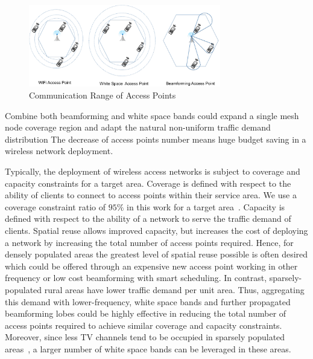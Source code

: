 \begin{figure}
\centering
\includegraphics[width=84mm]{figures/com_range}
\vspace{-0.1in}
\caption{Communication Range of Access Points}                                                                 
\label{fig:aprange}
\vspace{-0.1in}
\end{figure}

Combine both beamforming and white space bands could expand a 
single mesh node coverage region 
and adapt the natural non-uniform 
traffic demand distribution 
The decrease of access points number means huge budget saving
in a wireless network deployment.

Typically, the deployment of wireless access networks is subject to coverage and capacity
constraints for a target area. Coverage is defined with respect to the ability of
clients to connect to access points within their service area.  We use a coverage
constraint ratio of $95\%$ in this work for a target area~\cite{robinson2010deploying}.
Capacity is defined with respect to the ability of a network to serve the traffic 
demand of clients.  Spatial reuse allows improved capacity, but increases the cost
of deploying a network by increasing the total number of access points required.
Hence, for densely populated areas the greatest level of spatial reuse possible
is often desired which could be offered through an expensive new access point working 
in other frequency or low cost beamforming with smart scheduling.
In contrast, sparsely-populated rural areas have lower traffic demand per unit area. Thus, 
aggregating this demand with lower-frequency, white space bands and further propagated beamforming
lobes could be highly effective in reducing the total number of access points required to achieve 
similar coverage and capacity constraints. 
Moreover, since less TV channels tend to be occupied in sparsely 
populated areas~\cite{msdatabase}, a larger number 
 of white space bands can be leveraged in these areas. 





